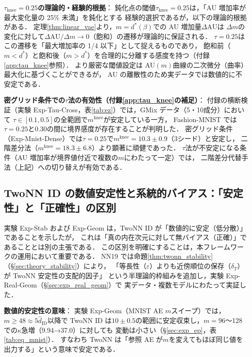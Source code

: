\documentclass[11pt,a4paper]{jsarticle}
\newcommand{\mknee}{m^{\mathrm{knee}}}
\begin{document}
\textbf{$\tau_{\mathrm{knee}} = 0.25$の理論的・経験的根拠}：
鈍化点の閾値$\tau_{\mathrm{knee}} = 0.25$は，「AU 増加率が最大変化量の 25\% 未満」を鈍化とする
経験的選択であるが，以下の理論的根拠がある．
定理\ref{thm:linear_vae}より，$m = d^*(\beta)$での AU 増加量$\Delta\mathrm{AU}$は
$\Delta m$の変化に対して$\Delta\mathrm{AU}/\Delta m \to 0$（飽和）の遷移が理論的に保証される．
$\tau = 0.25$はこの遷移を「最大増加率の 1/4 以下」として捉えるものであり，
飽和前（$m < d^*$）と飽和後（$m > d^*$）を合理的に分離する感度を持つ（付録\ref{app:tau_knee}参照）．
より厳密な閾値設定は AU$(m)$曲線の二次微分（曲率）最大化に基づくことができるが，
AU の離散性のため実データでは数値的に不安定である．

\textbf{密グリッド条件での$\tau$法の有効性（付録\ref{app:tau_knee}の補足）}：
付録の横断検証（実験 Exp-Tau-Cross，表\ref{tab:ez}）では，GMix データ（5・10成分）において
$\tau \in [0.1, 0.5]$の全範囲で$\mknee$が安定している一方，
Fashion-MNIST では$\tau = 0.25$と$0.30$の間に境界感度が存在することが判明した．
密グリッド条件（Exp-Mnist-Dense）では$\tau = 0.25$で$\mknee = 10.3 \pm 0.9$（3シード）と安定し，
二階差分法（$\mknee = 18.3 \pm 6.8$）より顕著に頑健であった．
$\tau$法が不安定になる条件（AU 増加率が境界値付近で複数の$m$にわたって一定）では，
二階差分代替手法（上記）への切り替えが有効である．

\subsection{TwoNN ID の数値安定性と系統的バイアス：「安定性」と「正確性」の区別}\label{sec:disc_twonn_bias}

実験 Exp-Stab および Exp-Geom は，TwoNN ID が「数値的に安定（低分散）」であることを示したが，
これは「真の内在次元に対して無バイアス（正確）」であることとは別の主張である．
この区別を明確にすることは，本フレームワークの運用において重要である．
NN19 では命題\ref{thm:twonn_stability}（§\ref{sec:theory_stability}）により，
「等長性（$\varepsilon$）よりも近傍順位の保存（$\delta_T$）が TwoNN 安定性の支配的因子」
という半理論的枠組みを追加し，実験 Exp-Real-Geom（§\ref{sec:exp_real_geom}）で
実データ・複数モデルにわたって実証した．

\textbf{数値的安定性の意味}：
実験 Exp-Geom（MNIST AE $m$スイープ）では，$m \geq 48 \approx 5\hat{d}_\mathrm{ID}$以降で
TwoNN ID は$10 \pm 0.5$の範囲に安定収束し，$m = 96$〜128 での$\kappa$急増（9.94→37.0）に対しても
変動は小さい（§\ref{sec:exp_ep}，表\ref{tab:eq_mnist}）．
すなわち TwoNN は「参照 AE が$m$を変えてもほぼ同じ値を出力する」という意味で安定である．
\end{document}
